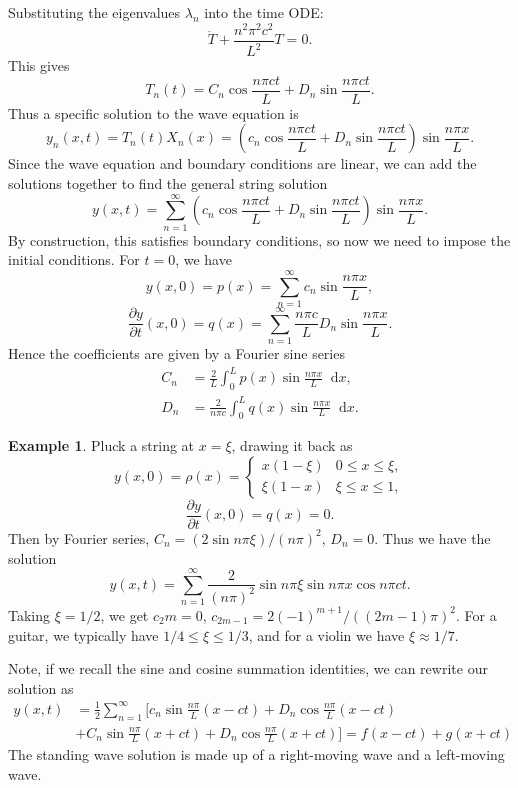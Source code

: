 \documentclass[12pt]{article}
\newcommand{\diff}{\mathop{}\!\mathrm{d}}
\theoremstyle{definition}
\newtheorem{example}{Example}[section]
\theoremstyle{remark}
\begin{document}
Substituting the eigenvalues $\lambda_n$ into the time ODE:
\[
\ddot T + \frac{n^2 \pi^2 c^2}{L^2} T = 0
.\]
This gives
\[
	T_n(t) = C_n \cos \frac{n \pi ct}{L} + D_n \sin \frac{n \pi ct}{L}
.\]
Thus a specific solution to the wave equation is
\[
	y_n(x, t) = T_n(t)X_n(x) = \left(c_n \cos \frac{n \pi ct}{L} + D_n \sin \frac{n \pi ct}{L} \right) \sin \frac{n \pi x}{L}
.\]
Since the wave equation and boundary conditions are linear, we can add the solutions together to find the general string solution
\[
	y(x, t) = \sum_{n = 1}^{\infty} \left( c_n \cos \frac{n \pi ct}{L} + D_n \sin \frac{n \pi ct}{L} \right) \sin \frac{n \pi x}{L}
.\]
By construction, this satisfies boundary conditions, so now we need to impose the initial conditions. For $t = 0$, we have
\[
	y(x, 0) = p(x) = \sum_{n = 1}^{\infty} c_n \sin \frac{n \pi x}{L}
,\]
\[
	\frac{\partial y}{\partial t}(x, 0) = q(x) = \sum_{n = 1}^{\infty} \frac{n \pi c}{L} D_n \sin \frac{n \pi x}{L}
.\]
Hence the coefficients are given by a Fourier sine series
\begin{align*}
	C_n &= \frac{2}{L} \int_{0}^{L}p(x) \sin \frac{n \pi x}{L} \diff x, \\
	D_n &= \frac{2}{n \pi c} \int_{0}^{L}q(x) \sin \frac{n \pi x}{L} \diff x.
\end{align*}

\begin{adjustbox}{minipage = \columnwidth - 25.5pt, margin=1em, frame=1pt, margin=0em}
\begin{example}
	Pluck a string at $x = \xi$, drawing it back as
	\[
		y(x, 0) = \rho(x) =
		\begin{cases}
			x(1 - \xi) & 0 \leq x \leq \xi, \\
			\xi(1 - x) & \xi \leq x \leq 1,
		\end{cases}
	\]
	\[
		\frac{\partial y}{\partial t} (x, 0) = q(x) = 0
	.\]
	Then by Fourier series, $C_n = (2 \sin n \pi \xi)/(n \pi)^2$, $D_n = 0$. Thus we have the solution
	\[
		y(x, t) = \sum_{n = 1}^{\infty} \frac{2}{(n \pi)^2} \sin n \pi \xi \sin n \pi x \cos n \pi c t
	.\]
	Taking $\xi = 1/2$, we get $c_2m = 0$, $c_{2m-1} = 2(-1)^{m+1}/((2m-1)\pi)^2$. For a guitar, we typically have $1/4 \leq \xi \leq 1/3$, and for a violin we have $\xi \approx 1/7$.
\end{example}

\end{adjustbox}

Note, if we recall the sine and cosine summation identities, we can rewrite our solution as
\begin{align*}
	y(x, t) &= \frac{1}{2} \sum_{n = 1}^{\infty}\biggl[ c_n \sin \frac{n \pi}{L} (x - ct) + D_n \cos \frac{n \pi}{L} (x - ct) \\
		&+ C_n \sin \frac{n \pi}{L} (x + ct) + D_n \cos \frac{n \pi}{L} (x + ct) \biggr] = f(x - ct) + g(x + ct)
\end{align*}
The standing wave solution is made up of a right-moving wave and a left-moving wave.
\end{document}
